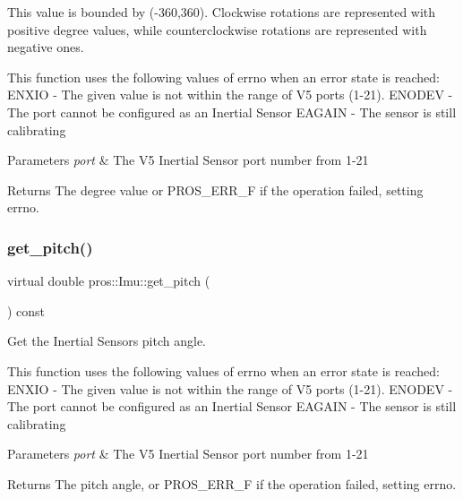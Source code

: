 This value is bounded by (-\/360,360). Clockwise rotations are represented with positive degree values, while counterclockwise rotations are represented with negative ones.

This function uses the following values of errno when an error state is reached\+: E\+N\+X\+IO -\/ The given value is not within the range of V5 ports (1-\/21). E\+N\+O\+D\+EV -\/ The port cannot be configured as an Inertial Sensor E\+A\+G\+A\+IN -\/ The sensor is still calibrating


\begin{DoxyParams}{Parameters}
{\em port} & The V5 Inertial Sensor port number from 1-\/21 \\
\hline
\end{DoxyParams}
\begin{DoxyReturn}{Returns}
The degree value or P\+R\+O\+S\+\_\+\+E\+R\+R\+\_\+F if the operation failed, setting errno. 
\end{DoxyReturn}
\mbox{\label{classpros_1_1Imu_a9d9e7ad1da6ea8877c48e1b4fadfe8ee}} 
\subsubsection{\texorpdfstring{get\+\_\+pitch()}{get\_pitch()}}
{\footnotesize\ttfamily virtual double pros\+::\+Imu\+::get\+\_\+pitch (\begin{DoxyParamCaption}{ }\end{DoxyParamCaption}) const\hspace{0.3cm}{\ttfamily [virtual]}}



Get the Inertial Sensor\textquotesingle{}s pitch angle. 

This function uses the following values of errno when an error state is reached\+: E\+N\+X\+IO -\/ The given value is not within the range of V5 ports (1-\/21). E\+N\+O\+D\+EV -\/ The port cannot be configured as an Inertial Sensor E\+A\+G\+A\+IN -\/ The sensor is still calibrating


\begin{DoxyParams}{Parameters}
{\em port} & The V5 Inertial Sensor port number from 1-\/21 \\
\hline
\end{DoxyParams}
\begin{DoxyReturn}{Returns}
The pitch angle, or P\+R\+O\+S\+\_\+\+E\+R\+R\+\_\+F if the operation failed, setting errno. 
\end{DoxyReturn}
\mbox{\label{classpros_1_1Imu_a3656b2476bb3ab8c2539615f76a0db39}} 
